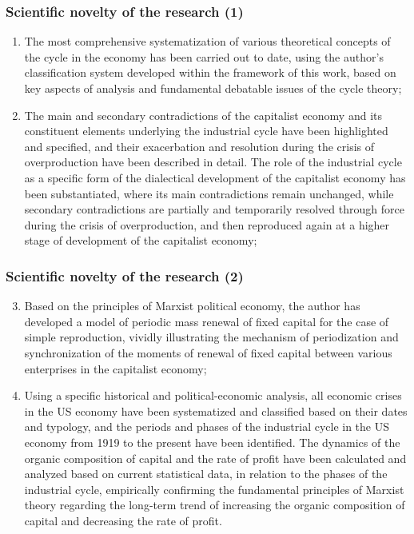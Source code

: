 \begin{frame}
  \frametitle{Scientific novelty of the research (1)}
  \begin{enumerate}
    \item The most comprehensive systematization of various theoretical concepts of the cycle in the economy has been carried out to date, using the author's classification system developed within the framework of this work, based on key aspects of analysis and fundamental debatable issues of the cycle theory;
    \item The main and secondary contradictions of the capitalist economy and its constituent elements underlying the industrial cycle have been highlighted and specified, and their exacerbation and resolution during the crisis of overproduction have been described in detail. The role of the industrial cycle as a specific form of the dialectical development of the capitalist economy has been substantiated, where its main contradictions remain unchanged, while secondary contradictions are partially and temporarily resolved through force during the crisis of overproduction, and then reproduced again at a higher stage of development of the capitalist economy;
\end{enumerate}
\end{frame}

\begin{frame}
  \frametitle{Scientific novelty of the research (2)}
  \begin{enumerate}
    \setcounter{enumi}{2}
    \item Based on the principles of Marxist political economy, the author has developed a model of periodic mass renewal of fixed capital for the case of simple reproduction, vividly illustrating the mechanism of periodization and synchronization of the moments of renewal of fixed capital between various enterprises in the capitalist economy;
    \item Using a specific historical and political-economic analysis, all economic crises in the US economy have been systematized and classified based on their dates and typology, and the periods and phases of the industrial cycle in the US economy from 1919 to the present have been identified. The dynamics of the organic composition of capital and the rate of profit have been calculated and analyzed based on current statistical data, in relation to the phases of the industrial cycle, empirically confirming the fundamental principles of Marxist theory regarding the long-term trend of increasing the organic composition of capital and decreasing the rate of profit.
  \end{enumerate}
\end{frame}

